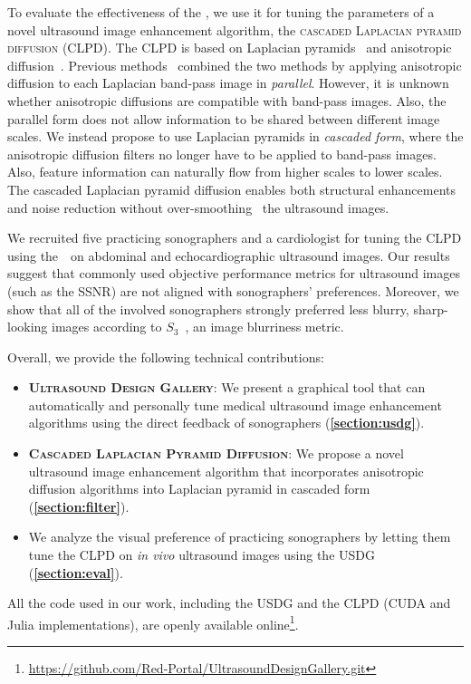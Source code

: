 To evaluate the effectiveness of the \usdg, we use it for tuning the parameters of a novel ultrasound image enhancement algorithm, the \textsc{cascaded Laplacian pyramid diffusion} (CLPD).
The CLPD is based on Laplacian pyramids~\cite{burt_laplacian_1983} and anisotropic diffusion~\cite{perona_scalespace_1990, weickert_anisotropic_1998}.
Previous methods~\cite{zhang_multiscale_2006, zhang_nonlinear_2007, kang_new_2016} combined the two methods by applying anisotropic diffusion to each Laplacian band-pass image in \textit{parallel}. However, it is unknown whether anisotropic diffusions are compatible with band-pass images.
Also, the parallel form does not allow information to be shared between different image scales.
We instead propose to use Laplacian pyramids in \textit{cascaded form}, where the anisotropic diffusion filters no longer have to be applied to band-pass images.
Also, feature information can naturally flow from higher scales to lower scales.
The cascaded Laplacian pyramid diffusion enables both structural enhancements and noise reduction without over-smoothing~\cite{ramos-llorden_anisotropic_2015, mishra_edge_2018} the ultrasound images.

We recruited five practicing sonographers and a cardiologist for tuning the CLPD using the~\usdg~on abdominal and echocardiographic ultrasound images.
Our results suggest that commonly used objective performance metrics for ultrasound images (such as the SSNR) are not aligned with sonographers' preferences.
Moreover, we show that all of the involved sonographers strongly preferred less blurry, sharp-looking images according to \(S_3\)~\cite{vu_bf_2012}, an image blurriness metric.

\noindent Overall, we provide the following technical contributions:
\begin{itemize}
  \item[\ding{228}] \textsc{\textbf{Ultrasound Design Gallery}}: We present a graphical tool that can automatically and personally tune medical ultrasound image enhancement algorithms using the direct feedback of sonographers (\textbf{\cref{section:usdg}}).
    \vspace{0.02in}
  \item[\ding{228}] \textsc{\textbf{Cascaded Laplacian Pyramid Diffusion}}:  We propose a novel ultrasound image enhancement algorithm that incorporates anisotropic diffusion algorithms into Laplacian pyramid in cascaded form (\textbf{\cref{section:filter}}).
  \item[\ding{228}] We analyze the visual preference of practicing sonographers by letting them tune the CLPD on \textit{in vivo} ultrasound images using the USDG (\textbf{\cref{section:eval}}).
\end{itemize}
All the code used in our work, including the USDG and the CLPD (CUDA and Julia implementations), are openly available online\footnote{\url{https://github.com/Red-Portal/UltrasoundDesignGallery.git}}.

